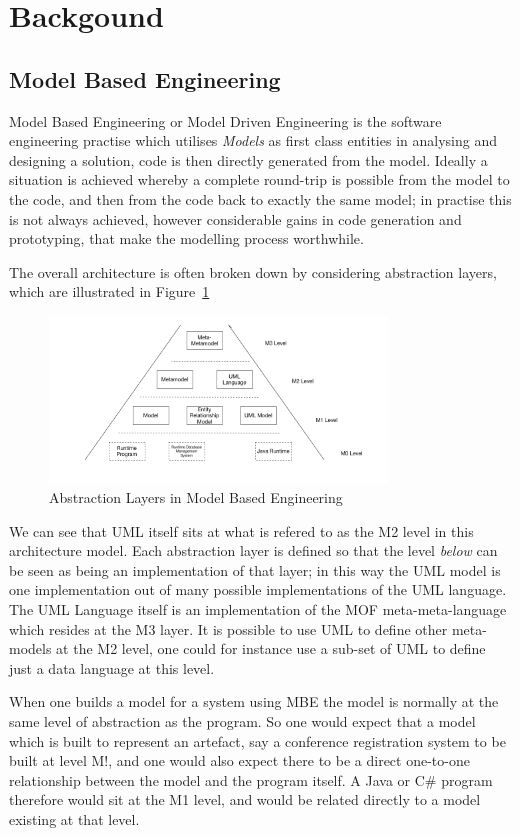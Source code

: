 \documentclass{llncs}
\begin{document}
\section{Backgound}

\subsection{Model Based Engineering}
Model Based Engineering or Model Driven Engineering is the software engineering practise which utilises \emph{Models} as first class entities in analysing and designing a solution, code is then directly generated from the model. Ideally a situation is achieved whereby a complete round-trip is possible from the model to the code, and then from the code back to exactly the same model; in practise this is not always achieved, however considerable gains in code generation and prototyping, that make the modelling process worthwhile.

The overall architecture is often broken down by considering abstraction layers, which are illustrated in Figure~\ref{fig:mbe1}
\begin{figure}[h]
\includegraphics[width=0.8\textwidth,natwidth=610,natheight=642]{Models1}
\caption{Abstraction Layers in Model Based Engineering} 
\label{fig:mbe1}
\end{figure}
We can see that UML itself sits at what is refered to as the M2 level in this architecture model. Each abstraction layer is defined so that the level \emph{below} can be seen as being an implementation of that layer; in this way the UML model is one implementation out of many possible implementations of the UML language. The UML Language itself is an implementation of the MOF meta-meta-language which resides at the M3 layer. It is possible to use UML to define other meta-models at the M2 level, one could for instance use a sub-set of UML to define just a data language at this level.

When one builds a model for a system using MBE the model is normally at the same level of abstraction as the program.  So one would expect that a model which is built to represent an artefact, say a conference registration system to be built at level M!, and one would also expect there to be a direct one-to-one relationship between the model and the program itself. A Java or C\# program therefore would sit at the M1 level, and would be related directly to a model existing at that level.
\end{document}
